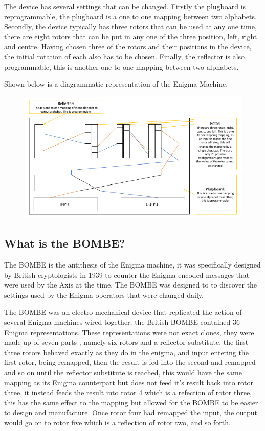\documentclass[12pt,a4paper]{article}
\begin{document}
The device has several settings that can be changed. Firstly the plugboard is reprogrammable, the plugboard is a one to one mapping between two alphabets. Secondly, the device typically has three rotors that can be used at any one time, there are eight rotors that can be put in any one of the three position, left, right and centre. Having chosen three of the rotors and their positions in the device, the initial rotation of each also has to be chosen. Finally, the reflector is also programmable, this is another one to one mapping between two alphabets.

Shown below is a diagrammatic representation of the Enigma Machine.

\begin{figure}[h]
\centering
\includegraphics[width=\textwidth]{enigmaDiagram.png}
\end{figure}

\subsection{What is the BOMBE?}

The BOMBE is the antithesis of the Enigma machine, it was specifically designed by British cryptologists in 1939 to counter the Enigma encoded messages that were used by the Axis at the time. The BOMBE was designed to to discover the settings used by the Enigma operators that were changed daily. 

The BOMBE was an electro-mechanical device that replicated the action of several Enigma machines wired together; the British BOMBE contained 36 Enigma representations. These representations were not exact clones, they were made up of seven parts , namely six rotors and a reflector substitute. the first three rotors behaved exactly as they do in the enigma, and input entering the first rotor, being remapped, then the result is fed into the second and remapped and so on until the reflector substitute is reached, this would have the same mapping as its Enigma counterpart but does not feed it's result back into rotor three, it instead feeds the result into rotor 4 which is a refection of rotor three, this has the same effect to the mapping but allowed for the BOMBE to be easier to design and manufacture. Once rotor four had remapped the input, the output would go on to rotor five which is a reflection of rotor two, and so forth.
\end{document}

